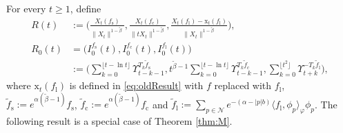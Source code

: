 \documentclass[12pt,a4paper]{amsart}
\theoremstyle{plain}
\theoremstyle{definition}
\numberwithin{equation}{section}
\begin{document}
	For every $t\geq 1$, define
\begin{align}
	R(t)
	&:=\Big( \frac{X_t(f_\mathrm s)}{\|X_t\|^{1-\tilde \beta}},\frac{X_t(f_\mathrm c)}{\|tX_t\|^{1-\tilde \beta}},\frac{ X_t(f_\mathrm l) - \mathrm x_t(f_\mathrm l)}{\|X_t\|^{1-\tilde \beta}}\Big),
    \\R_0(t)
    &=\big(I_0^{f_\mathrm s}(t),I_0^{f_\mathrm c}(t),I_0^{f_\mathrm l}(t)\big)
    \\&:=\Big(\sum_{k=0}^{\lfloor t-\ln t \rfloor} \Upsilon_{t-k-1}^{T_k \tilde f_\mathrm s},t^{\tilde \beta - 1}\sum_{k=0}^{\lfloor t-\ln t \rfloor} \Upsilon_{t-k-1}^{T_{k} \tilde f_\mathrm c},\sum_{k = 0}^{\lfloor t^2 \rfloor} \Upsilon_{t+k}^{- T_k \tilde f_\mathrm l}\Big),
\end{align}
	where $\mathrm x_t(f_\mathrm l)$ is defined in \eqref{eq:oldResult} with $f$ replaced with $f_\mathrm l$, $\tilde f_\mathrm s:=e^{\alpha(\tilde \beta - 1)} f_\mathrm s$, $\tilde f_\mathrm c:=e^{\alpha(\tilde \beta - 1)} f_\mathrm c$ and  $\tilde f_\mathrm l := \sum_{p\in \mathcal N} e^{-(\alpha - |p|b)}\langle f_\mathrm l, \phi_p \rangle_\varphi \phi_p$.
	The following result is a special case of Theorem \ref{thm:M}.
\end{document}
